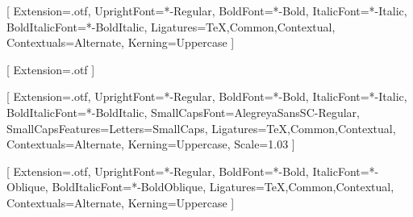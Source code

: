 %
%
%

\usepackage{fontspec}

\setmainfont{ETbb}[
  Extension=.otf,
  UprightFont=*-Regular,
  BoldFont=*-Bold,
  ItalicFont=*-Italic,
  BoldItalicFont=*-BoldItalic,
  Ligatures={TeX,Common,Contextual},
  Contextuals={Alternate},
  Kerning=Uppercase
]

\usepackage{unicode-math}
[
  Extension=.otf
]

\setsansfont{AlegreyaSans}[
  Extension=.otf,
  UprightFont=*-Regular,
  BoldFont=*-Bold,
  ItalicFont=*-Italic,
  BoldItalicFont=*-BoldItalic,
  SmallCapsFont=AlegreyaSansSC-Regular,
  SmallCapsFeatures={Letters=SmallCaps},
  Ligatures={TeX,Common,Contextual},
  Contextuals={Alternate},
  Kerning=Uppercase,
  Scale=1.03
]

\setmonofont{FiraMono}[
  Extension=.otf,
  UprightFont=*-Regular,
  BoldFont=*-Bold,
  ItalicFont=*-Oblique,
  BoldItalicFont=*-BoldOblique,
  Ligatures={TeX,Common,Contextual},
  Contextuals={Alternate},
  Kerning=Uppercase
]

